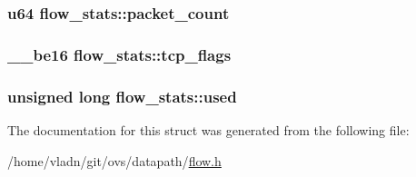 \subsubsection[{packet\+\_\+count}]{\setlength{\rightskip}{0pt plus 5cm}u64 flow\+\_\+stats\+::packet\+\_\+count}\label{structflow__stats_a9399b2cdc3d48c11357fbc2aaff33226}
\hypertarget{structflow__stats_a2b2812adf4fd5f4f188324fdf503deba}{}
\subsubsection[{tcp\+\_\+flags}]{\setlength{\rightskip}{0pt plus 5cm}\+\_\+\+\_\+be16 flow\+\_\+stats\+::tcp\+\_\+flags}\label{structflow__stats_a2b2812adf4fd5f4f188324fdf503deba}
\hypertarget{structflow__stats_a3eefc54cf53ad3e24bb070bd6f251f50}{}
\subsubsection[{used}]{\setlength{\rightskip}{0pt plus 5cm}unsigned long flow\+\_\+stats\+::used}\label{structflow__stats_a3eefc54cf53ad3e24bb070bd6f251f50}


The documentation for this struct was generated from the following file\+:\begin{DoxyCompactItemize}
\item 
/home/vladn/git/ovs/datapath/\hyperlink{flow_8h}{flow.\+h}\end{DoxyCompactItemize}
